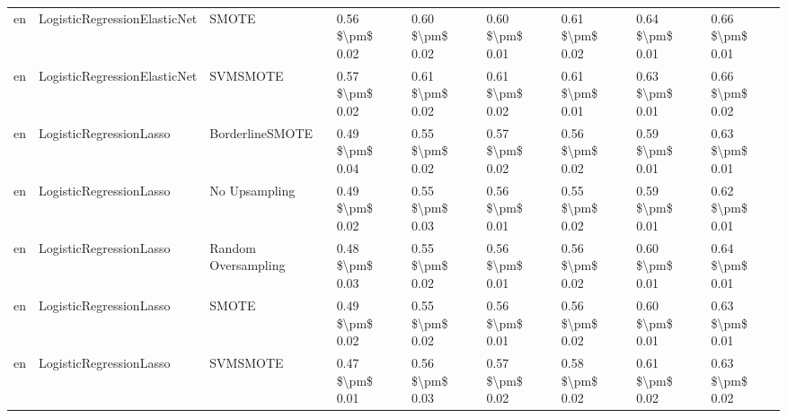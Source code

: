 \begin{tabular}{lllllllll}
      en &    LogisticRegressionElasticNet &                         SMOTE &     0.56 \$\textbackslash pm\$ 0.02 &           0.60 \$\textbackslash pm\$ 0.02 &       0.60 \$\textbackslash pm\$ 0.01 &        0.61 \$\textbackslash pm\$ 0.02 &                         0.64 \$\textbackslash pm\$ 0.01 &     0.66 \$\textbackslash pm\$ 0.01 \\
      en &    LogisticRegressionElasticNet &                      SVMSMOTE &     0.57 \$\textbackslash pm\$ 0.02 &           0.61 \$\textbackslash pm\$ 0.02 &       0.61 \$\textbackslash pm\$ 0.02 &        0.61 \$\textbackslash pm\$ 0.01 &                         0.63 \$\textbackslash pm\$ 0.01 &     0.66 \$\textbackslash pm\$ 0.02 \\
      en &         LogisticRegressionLasso &               BorderlineSMOTE &     0.49 \$\textbackslash pm\$ 0.04 &           0.55 \$\textbackslash pm\$ 0.02 &       0.57 \$\textbackslash pm\$ 0.02 &        0.56 \$\textbackslash pm\$ 0.02 &                         0.59 \$\textbackslash pm\$ 0.01 &     0.63 \$\textbackslash pm\$ 0.01 \\
      en &         LogisticRegressionLasso &                 No Upsampling &     0.49 \$\textbackslash pm\$ 0.02 &           0.55 \$\textbackslash pm\$ 0.03 &       0.56 \$\textbackslash pm\$ 0.01 &        0.55 \$\textbackslash pm\$ 0.02 &                         0.59 \$\textbackslash pm\$ 0.01 &     0.62 \$\textbackslash pm\$ 0.01 \\
      en &         LogisticRegressionLasso &           Random Oversampling &     0.48 \$\textbackslash pm\$ 0.03 &           0.55 \$\textbackslash pm\$ 0.02 &       0.56 \$\textbackslash pm\$ 0.01 &        0.56 \$\textbackslash pm\$ 0.02 &                         0.60 \$\textbackslash pm\$ 0.01 &     0.64 \$\textbackslash pm\$ 0.01 \\
      en &         LogisticRegressionLasso &                         SMOTE &     0.49 \$\textbackslash pm\$ 0.02 &           0.55 \$\textbackslash pm\$ 0.02 &       0.56 \$\textbackslash pm\$ 0.01 &        0.56 \$\textbackslash pm\$ 0.02 &                         0.60 \$\textbackslash pm\$ 0.01 &     0.63 \$\textbackslash pm\$ 0.01 \\
      en &         LogisticRegressionLasso &                      SVMSMOTE &     0.47 \$\textbackslash pm\$ 0.01 &           0.56 \$\textbackslash pm\$ 0.03 &       0.57 \$\textbackslash pm\$ 0.02 &        0.58 \$\textbackslash pm\$ 0.02 &                         0.61 \$\textbackslash pm\$ 0.02 &     0.63 \$\textbackslash pm\$ 0.02 \\

\end{tabular}
